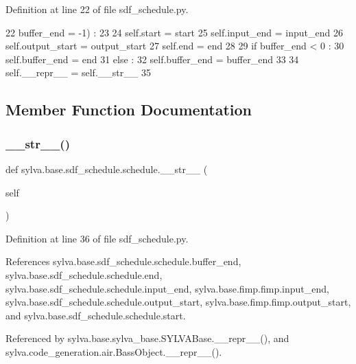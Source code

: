 Definition at line 22 of file sdf\+\_\+schedule.\+py.


\begin{DoxyCode}
22     buffer\_end = -1) :
23 
24     self.start = start
25     self.input\_end = input\_end
26     self.output\_start = output\_start
27     self.end = end
28 
29     \textcolor{keywordflow}{if} buffer\_end < 0 :
30       self.buffer\_end = end
31     \textcolor{keywordflow}{else} :
32       self.buffer\_end = buffer\_end
33 
34     self.\_\_repr\_\_ = self.\_\_str\_\_
35 
\end{DoxyCode}


\subsection{Member Function Documentation}
\mbox{\label{classsylva_1_1base_1_1sdf__schedule_1_1schedule_a22e37ed6ccea017541f563714c0af989}} 
\subsubsection{\texorpdfstring{\+\_\+\+\_\+str\+\_\+\+\_\+()}{\_\_str\_\_()}}
{\footnotesize\ttfamily def sylva.\+base.\+sdf\+\_\+schedule.\+schedule.\+\_\+\+\_\+str\+\_\+\+\_\+ (\begin{DoxyParamCaption}\item[{}]{self }\end{DoxyParamCaption})}



Definition at line 36 of file sdf\+\_\+schedule.\+py.



References sylva.\+base.\+sdf\+\_\+schedule.\+schedule.\+buffer\+\_\+end, sylva.\+base.\+sdf\+\_\+schedule.\+schedule.\+end, sylva.\+base.\+sdf\+\_\+schedule.\+schedule.\+input\+\_\+end, sylva.\+base.\+fimp.\+fimp.\+input\+\_\+end, sylva.\+base.\+sdf\+\_\+schedule.\+schedule.\+output\+\_\+start, sylva.\+base.\+fimp.\+fimp.\+output\+\_\+start, and sylva.\+base.\+sdf\+\_\+schedule.\+schedule.\+start.



Referenced by sylva.\+base.\+sylva\+\_\+base.\+S\+Y\+L\+V\+A\+Base.\+\_\+\+\_\+repr\+\_\+\+\_\+(), and sylva.\+code\+\_\+generation.\+air.\+Bass\+Object.\+\_\+\+\_\+repr\+\_\+\+\_\+().


